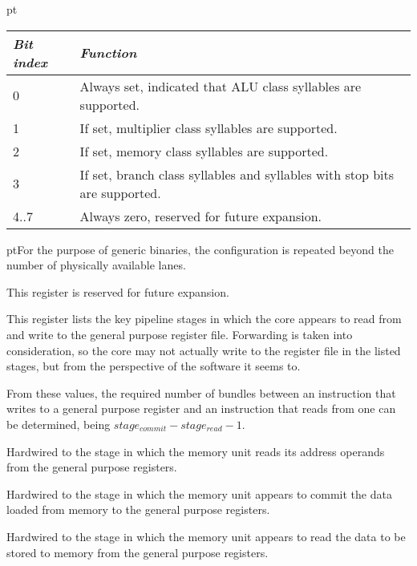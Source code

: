  pt\noindent\begin{tabular}{|l|p{12cm}|}
\hline
\emph{Bit index} & \emph{Function} \\
\hline
0 & Always set, indicated that ALU class syllables are supported. \\
\hline
1 & If set, multiplier class syllables are supported. \\
\hline
2 & If set, memory class syllables are supported. \\
\hline
3 & If set, branch class syllables and syllables with stop bits are supported. \\
\hline
4..7 & Always zero, reserved for future expansion. \\
\hline
\end{tabular}

 pt\noindent For the purpose of generic binaries, the configuration is 
repeated beyond the number of physically available lanes.


This register is reserved for future expansion.


This register lists the key pipeline stages in which the core appears to read
from and write to the general purpose register file. Forwarding is taken into
consideration, so the core may not actually write to the register file in the
listed stages, but from the perspective of the software it seems to.

From these values, the required number of bundles between an instruction that
writes to a general purpose register and an instruction that reads from one can
be determined, being $stage_{commit} - stage_{read} - 1$.

\reset{****}
Hardwired to the stage in which the memory unit reads its address operands from
the general purpose registers.

\reset{****}
Hardwired to the stage in which the memory unit appears to commit the data
loaded from memory to the general purpose registers.

\reset{****}
Hardwired to the stage in which the memory unit appears to read the data to be
stored to memory from the general purpose registers.

